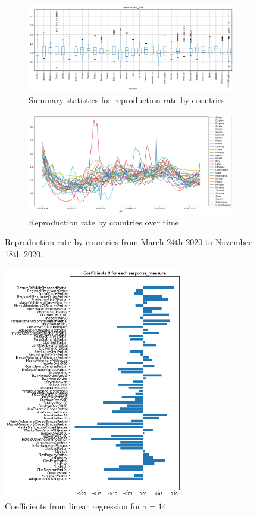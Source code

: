 \documentclass[11pt]{article}
\begin{document}
\begin{figure}[h]
     \centering
     \begin{subfigure}[b]{0.8\textwidth}
         \centering
         \includegraphics[width=\textwidth]{box_reproduction.png}
         \caption{Summary statistics for reproduction rate by countries}
         \label{fig:box_reproduction}
     \end{subfigure}
     \begin{subfigure}[b]{0.8\textwidth}
         \centering
         \includegraphics[width=\textwidth]{ts_reproduction.png}
         \caption{Reproduction rate by countries over time}
         \label{fig:ts_reproduction}
     \end{subfigure}
     \caption{Reproduction rate by countries from March 24th 2020 to November 18th 2020.}
\end{figure}
\begin{figure}[h]
    \centering
    \includegraphics[width=0.7\textwidth]{lr_coefficients.png}
    \caption{Coefficients from linear regression for $\tau=14$}
    \label{fig:my_label}
\end{figure}
\end{document}
